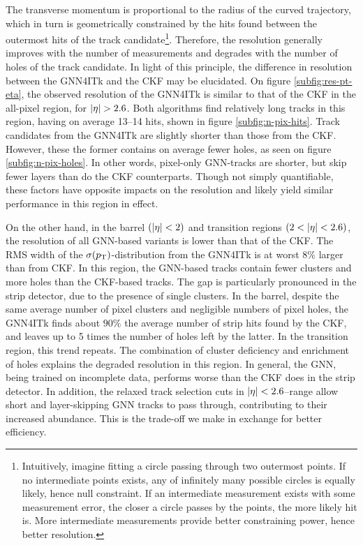 The transverse momentum is proportional to the radius of the curved trajectory, which in turn is geometrically constrained by the hits found between the outermost hits of the track candidate\footnote{Intuitively, imagine fitting a circle passing through two outermost points. If no intermediate points exists, any of infinitely many possible circles is equally likely, hence null constraint. If an intermediate measurement exists with some measurement error, the closer a circle passes by the points, the more likely hit is. More intermediate measurements provide better constraining power, hence better resolution.}.
Therefore, the \pT resolution generally improves with the number of measurements and degrades with the number of holes of the track candidate. 
In light of this principle, the difference in \pT resolution between the GNN4ITk and the CKF may be elucidated.
On figure \ref{subfig:res-pt-eta}, the observed \pT resolution of the GNN4ITk is similar to that of the CKF in the all-pixel region, for $\abs{\eta}>2.6$.
Both algorithms find relatively long tracks in this region, having on average 13--14 hits, shown in figure \ref{subfig:n-pix-hits}. 
Track candidates from the GNN4ITk are slightly shorter than those from the CKF.
However, these the former contains on average fewer holes, as seen on figure \ref{subfig:n-pix-holes}. 
In other words, pixel-only GNN-tracks are shorter, but skip fewer layers than do the CKF counterparts.
Though not simply quantifiable, these factors have opposite impacts on the \pT resolution and likely yield similar performance in this region in effect.

On the other hand, in the barrel $(\abs{\eta}<2)$ and transition regions $(2<\abs{\eta}<2.6)$, the \pT resolution of all GNN-based variants is lower than that of the CKF.
The RMS width of the $\sigma(p_{\text{T}})$-distribution from the GNN4ITk is at worst $8\%$ larger than from CKF.
In this region, the GNN-based tracks contain fewer clusters and more holes than the CKF-based tracks.
The gap is particularly pronounced in the strip detector, due to the presence of single clusters. 
In the barrel, despite the same average number of pixel clusters and negligible numbers of pixel holes, the GNN4ITk finds about $90\%$ the average number of strip hits found by the CKF, and leaves up to 5 times the number of holes left by the latter.
In the transition region, this trend repeats.
The combination of cluster deficiency and enrichment of holes explains the degraded \pT resolution in this region.
In general, the GNN, being trained on incomplete data, performs worse than the CKF does in the strip detector. 
In addition, the relaxed track selection cuts in $\abs{\eta}<2.6$--range allow short and layer-skipping GNN tracks to pass through, contributing to their increased abundance.
This is the trade-off we make in exchange for better efficiency.


